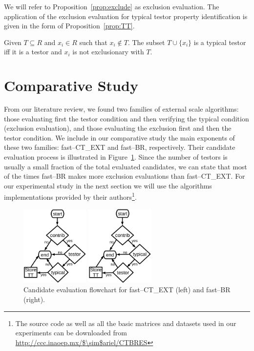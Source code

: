 \documentclass[citeauthoryear]{llncs}
\begin{document}
	We will refer to Proposition~\ref{prop:exclude} as exclusion evaluation. The application of the exclusion evaluation for typical testor property identification is given in the form of Proposition~\ref{prop:TT}.
	
	\begin{proposition}\label{prop:TT} 
			Given $T \subseteq R$ and $x_i \in R$ such that $x_i \notin T$. The subset $T \cup \lbrace x_i\rbrace$ is a typical testor iff it is a testor and $x_i$ is not exclusionary with $T$.
	\end{proposition}
		
%
\section{Comparative Study}
%
	  From our literature review, we found two families of external scale algorithms: those evaluating first the testor condition and then verifying the typical condition (exclusion evaluation), and those evaluating the exclusion first and then the testor condition. We include in our comparative study the main exponents of these two families: fast--CT\_EXT and fast--BR, respectively. Their candidate evaluation process is illustrated in Figure~\ref{fig:candeval}.  Since the number of testors is usually a small fraction of the total evaluated candidates, we can state that most of the times fast--BR makes more exclusion evaluations than fast--CT\_EXT. For our experimental study in the next section we will use the algorithms implementations provided by their authors\footnote{The source code as well as all the basic matrices and datasets used in our experiments can be downloaded from \url{http://ccc.inaoep.mx/$\sim$ariel/CTBRES}}.

	\begin{figure}[htb]
	    \centering
	    \begin{minipage}{.5\textwidth}
	        \centering
	        \includegraphics[height=4cm]{ct_ext.eps}
	    \end{minipage}%
	    \begin{minipage}{0.5\textwidth}
	        \centering
	        \includegraphics[height=4cm]{BR.eps}	        
	    \end{minipage}
		\caption{Candidate evaluation flowchart for fast--CT\_EXT (left) and fast--BR (right).}
		\label{fig:candeval}
	\end{figure}
	
\end{document}
